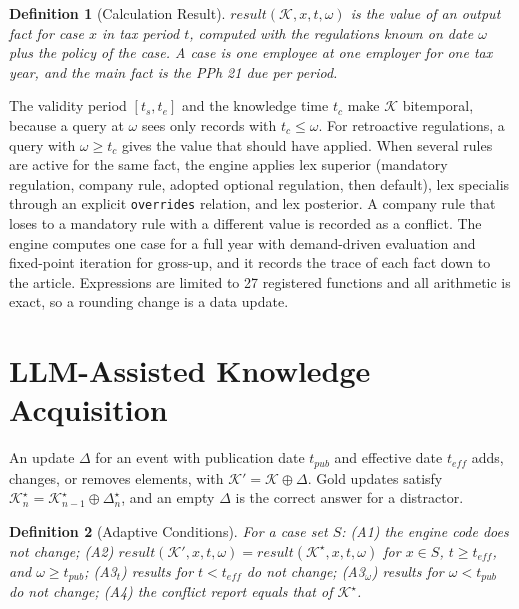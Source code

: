 \documentclass[conference]{IEEEtran}
\newtheorem{definition}{Definition}
\newcommand{\K}{\mathcal{K}}
\newcommand{\result}{\mathit{result}}
\newcommand{\gold}{\star}
\begin{document}
\begin{definition}[Calculation Result]
\label{def:hasil}
$\result(\K, x, t, \omega)$ is the value of an output fact for case $x$ in tax period $t$, computed with the regulations known on date $\omega$ plus the policy of the case. A case is one employee at one employer for one tax year, and the main fact is the PPh 21 due per period.
\end{definition}

The validity period $[t_s, t_e]$ and the knowledge time $t_c$ make $\K$ bitemporal, because a query at $\omega$ sees only records with $t_c \leq \omega$. For retroactive regulations, a query with $\omega \geq t_c$ gives the value that should have applied. When several rules are active for the same fact, the engine applies lex superior (mandatory regulation, company rule, adopted optional regulation, then default), lex specialis through an explicit \texttt{overrides} relation, and lex posterior. A company rule that loses to a mandatory rule with a different value is recorded as a conflict. The engine computes one case for a full year with demand-driven evaluation and fixed-point iteration for gross-up, and it records the trace of each fact down to the article. Expressions are limited to 27 registered functions and all arithmetic is exact, so a rounding change is a data update.

\section{LLM-Assisted Knowledge Acquisition}
\label{sec:akuisisi}
An update $\Delta$ for an event with publication date $t_{\mathit{pub}}$ and effective date $t_{\mathit{eff}}$ adds, changes, or removes elements, with $\K' = \K \oplus \Delta$. Gold updates satisfy $\K^{\gold}_n = \K^{\gold}_{n-1} \oplus \Delta^{\gold}_n$, and an empty $\Delta$ is the correct answer for a distractor.

\begin{definition}[Adaptive Conditions]
\label{def:syarat}
For a case set $S$: (A1) the engine code does not change; (A2) $\result(\K', x, t, \omega) = \result(\K^{\gold}, x, t, \omega)$ for $x \in S$, $t \geq t_{\mathit{eff}}$, and $\omega \geq t_{\mathit{pub}}$; (A3$_t$) results for $t < t_{\mathit{eff}}$ do not change; (A3$_\omega$) results for $\omega < t_{\mathit{pub}}$ do not change; (A4) the conflict report equals that of $\K^{\gold}$.
\end{definition}
\end{document}
